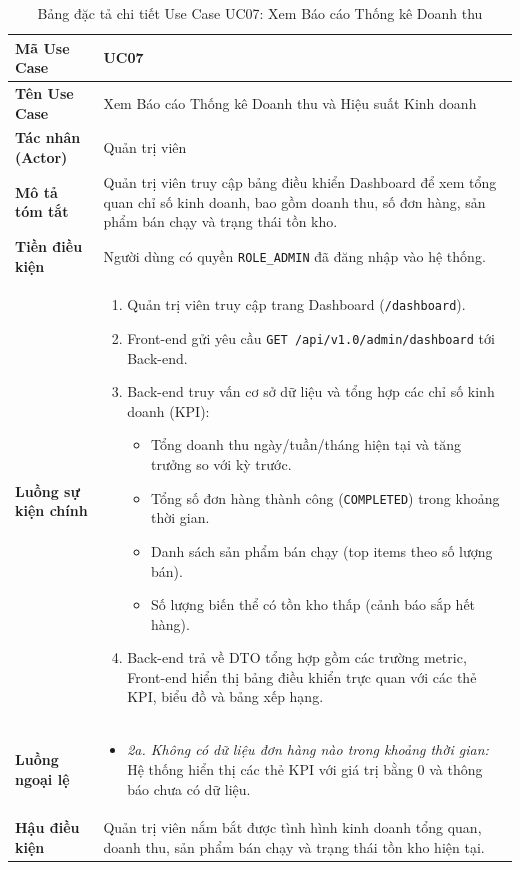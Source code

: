\begin{table}[htbp]
\centering
\caption{Bảng đặc tả chi tiết Use Case UC07: Xem Báo cáo Thống kê Doanh thu}
\label{tab:uc07_revenue_report}
\vspace{2mm}
\begin{tabularx}{\textwidth}{|l|X|}
\hline
\textbf{Mã Use Case} & \textbf{UC07} \\ \hline
\textbf{Tên Use Case} & Xem Báo cáo Thống kê Doanh thu và Hiệu suất Kinh doanh \\ \hline
\textbf{Tác nhân (Actor)} & Quản trị viên \\ \hline
\textbf{Mô tả tóm tắt} & Quản trị viên truy cập bảng điều khiển Dashboard để xem tổng quan chỉ số kinh doanh, bao gồm doanh thu, số đơn hàng, sản phẩm bán chạy và trạng thái tồn kho. \\ \hline
\textbf{Tiền điều kiện} & Người dùng có quyền \texttt{ROLE\_ADMIN} đã đăng nhập vào hệ thống. \\ \hline
\textbf{Luồng sự kiện chính} & 
\begin{enumerate}[leftmargin=*, nosep]
    \item Quản trị viên truy cập trang Dashboard (\texttt{/dashboard}).
    \item Front-end gửi yêu cầu \texttt{GET /api/v1.0/admin/dashboard} tới Back-end.
    \item Back-end truy vấn cơ sở dữ liệu và tổng hợp các chỉ số kinh doanh (KPI):
    \begin{itemize}
        \item Tổng doanh thu ngày/tuần/tháng hiện tại và tăng trưởng so với kỳ trước.
        \item Tổng số đơn hàng thành công (\texttt{COMPLETED}) trong khoảng thời gian.
        \item Danh sách sản phẩm bán chạy (top items theo số lượng bán).
        \item Số lượng biến thể có tồn kho thấp (cảnh báo sắp hết hàng).
    \end{itemize}
    \item Back-end trả về DTO tổng hợp gồm các trường metric, Front-end hiển thị bảng điều khiển trực quan với các thẻ KPI, biểu đồ và bảng xếp hạng.
\end{enumerate} \\ \hline
\textbf{Luồng ngoại lệ} & 
\begin{itemize}[leftmargin=*, nosep]
    \item \textit{2a. Không có dữ liệu đơn hàng nào trong khoảng thời gian:} Hệ thống hiển thị các thẻ KPI với giá trị bằng $0$ và thông báo chưa có dữ liệu.
\end{itemize} \\ \hline
\textbf{Hậu điều kiện} & Quản trị viên nắm bắt được tình hình kinh doanh tổng quan, doanh thu, sản phẩm bán chạy và trạng thái tồn kho hiện tại. \\ \hline
\end{tabularx}
\end{table}

